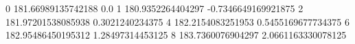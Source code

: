 0 181.66989135742188 0.0
1 180.9352264404297 -0.7346649169921875
2 181.97201538085938 0.3021240234375
4 182.2154083251953 0.5455169677734375
6 182.95486450195312 1.28497314453125
8 183.7360076904297 2.0661163330078125
